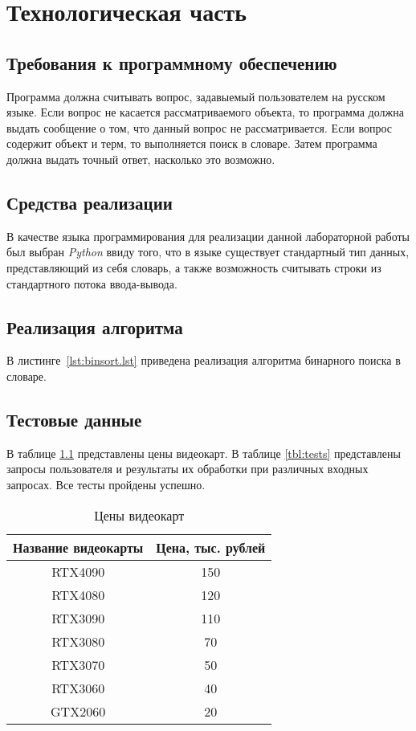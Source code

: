 \chapter{Технологическая часть}

\section{Требования к программному обеспечению}

Программа должна считывать вопрос, задавыемый пользователем на русском языке. 
Если вопрос не касается рассматриваемого объекта, то программа должна выдать сообщение о том, что данный вопрос не рассматривается. 
Если вопрос содержит объект и терм, то выполняется поиск в словаре. 
Затем программа должна выдать точный ответ, насколько это возможно.

\section{Средства реализации}

В качестве языка программирования для реализации данной лабораторной работы был выбран \textit{Python} ввиду того, что в языке существует стандартный тип данных, представляющий из себя словарь, а также возможность считывать строки из стандартного потока ввода-вывода.

\section{Реализация алгоритма}

В листинге~\ref{lst:binsort.lst} приведена реализация алгоритма бинарного поиска в словаре.
\clearpage
{}

\section{Тестовые данные}

В таблице \ref{tbl:gpu} представлены цены видеокарт.
В таблице \ref{tbl:tests} представлены запросы пользователя и результаты их обработки при различных входных запросах.
Все тесты пройдены успешно.

\begin{table}[H]
	\begin{center}
		\caption{Цены видеокарт}
		\label{tbl:gpu}
		\begin{tabular}{|c|c|}
			\hline
			Название видеокарты & Цена, тыс. рублей \\
			\hline
			RTX4090 & 150 \\ \hline
			RTX4080 & 120 \\ \hline
			RTX3090 & 110 \\ \hline
			RTX3080 & 70  \\ \hline
			RTX3070 & 50  \\ \hline
			RTX3060 & 40  \\ \hline
			GTX2060 & 20  \\ \hline
		\end{tabular}
	\end{center}
\end{table}


